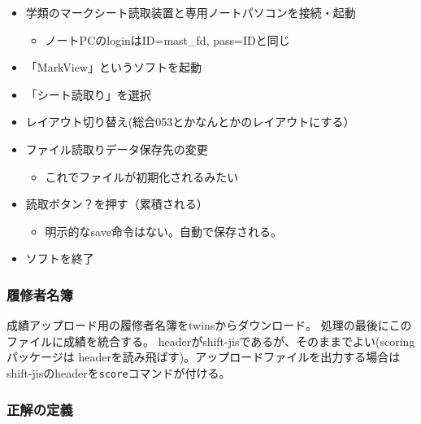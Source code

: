 \begin{itemize}
\item 学類のマークシート読取装置と専用ノートパソコンを接続・起動

\begin{itemize}
\item ノートPCのloginはID=mast\_fd, pass=IDと同じ

\end{itemize}

\item 「MarkView」というソフトを起動

\item 「シート読取り」を選択

\item レイアウト切り替え(総合053とかなんとかのレイアウトにする）

\item ファイル読取りデータ保存先の変更

\begin{itemize}
\item これでファイルが初期化されるみたい

\end{itemize}

\item 読取ボタン？を押す（累積される）

\begin{itemize}
\item 明示的なsave命令はない。自動で保存される。

\end{itemize}

\item ソフトを終了

\end{itemize}

\subsubsection{履修者名簿}
\label{履修者名簿}

成績アップロード用の履修者名簿をtwinsからダウンロード。
処理の最後にこのファイルに成績を統合する。
headerがshift-jisであるが、そのままでよい(scoringパッケージは
headerを読み飛ばす)。アップロードファイルを出力する場合は
shift-jisのheaderを\texttt{score}コマンドが付ける。

\subsubsection{正解の定義}
\label{正解の定義}

